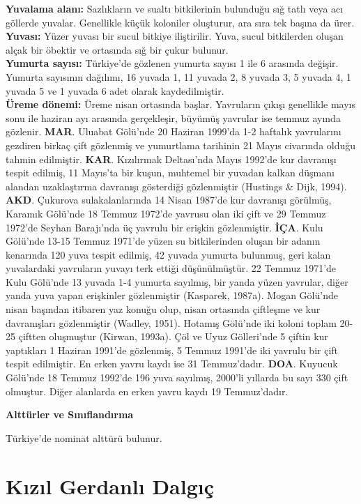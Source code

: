 \documentclass[
  a4paper,
  DIV=11,
  numbers=noendperiod]{scrreprt}
\begin{document}
\textbf{Yuvalama alanı:} Sazlıkların ve sualtı bitkilerinin bulunduğu
sığ tatlı veya acı göllerde yuvalar. Genellikle küçük koloniler
oluşturur, ara sıra tek başına da ürer.\\
\textbf{Yuvası:} Yüzer yuvası bir sucul bitkiye iliştirilir. Yuva, sucul
bitkilerden oluşan alçak bir öbektir ve ortasında sığ bir çukur
bulunur.\\
\textbf{Yumurta sayısı:} Türkiye'de gözlenen yumurta sayısı 1 ile 6
arasında değişir. Yumurta sayısının dağılımı, 16 yuvada 1, 11 yuvada 2,
8 yuvada 3, 5 yuvada 4, 1 yuvada 5 ve 1 yuvada 6 adet olarak
kaydedilmiştir.\\
\textbf{Üreme dönemi:} Üreme nisan ortasında başlar. Yavruların çıkışı
genellikle mayıs sonu ile haziran ayı arasında gerçekleşir, büyümüş
yavrular ise temmuz ayında gözlenir. \textbf{MAR}. Uluabat Gölü'nde 20
Haziran 1999'da 1-2 haftalık yavrularını gezdiren birkaç çift gözlenmiş
ve yumurtlama tarihinin 21 Mayıs civarında olduğu tahmin edilmiştir.
\textbf{KAR}. Kızılırmak Deltası'nda Mayıs 1992'de kur davranışı tespit
edilmiş, 11 Mayıs'ta bir kuşun, muhtemel bir yuvadan kalkan düşmanı
alandan uzaklaştırma davranışı gösterdiği gözlenmiştir (Hustings \&
Dijk, 1994). \textbf{AKD}. Çukurova sulakalanlarında 14 Nisan 1987'de
kur davranışı görülmüş, Karamık Gölü'nde 18 Temmuz 1972'de yavrusu olan
iki çift ve 29 Temmuz 1972'de Seyhan Barajı'nda üç yavrulu bir erişkin
gözlenmiştir. \textbf{İÇA}. Kulu Gölü'nde 13-15 Temmuz 1971'de yüzen su
bitkilerinden oluşan bir adanın kenarında 120 yuva tespit edilmiş, 42
yuvada yumurta bulunmuş, geri kalan yuvalardaki yavruların yuvayı terk
ettiği düşünülmüştür. 22 Temmuz 1971'de Kulu Gölü'nde 13 yuvada 1-4
yumurta sayılmış, bir yanda yüzen yavrular, diğer yanda yuva yapan
erişkinler gözlenmiştir (Kasparek, 1987a). Mogan Gölü'nde nisan başından
itibaren yaz konuğu olup, nisan ortasında çiftleşme ve kur davranışları
gözlenmiştir (Wadley, 1951). Hotamış Gölü'nde iki koloni toplam 20-25
çiftten oluşmuştur (Kirwan, 1993a). Çöl ve Uyuz Gölleri'nde 5 çiftin kur
yaptıkları 1 Haziran 1991'de gözlenmiş, 5 Temmuz 1991'de iki yavrulu bir
çift tespit edilmiştir. En erken yavru kaydı ise 31 Temmuz'dadır.
\textbf{DOA}. Kuyucuk Gölü'nde 18 Temmuz 1992'de 196 yuva sayılmış,
2000'li yıllarda bu sayı 330 çift olmuştur. Diğer alanlarda en erken
yavru kaydı 19 Temmuz'dadır.

\textbf{Alttürler ve Sınıflandırma}

Türkiye'de nominat alttürü bulunur.

\section{Kızıl Gerdanlı
Dalgıç}\label{kux131zux131l-gerdanlux131-dalgux131uxe7}
\end{document}
